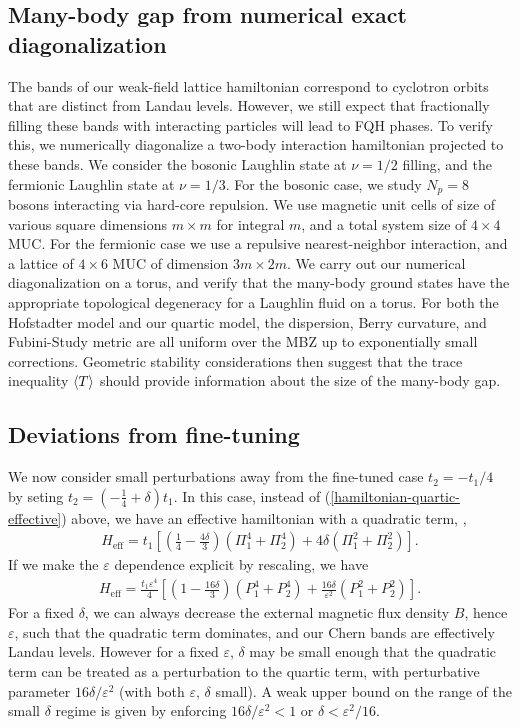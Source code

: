 \documentclass[aps,prb,twocolumn,letterpaper,twoside,nobalancelastpage,groupedaddress,amsmath,amssymb,floatfix,citeautoscript]{revtex4-1}
\begin{document}
\subsection{Many-body gap from numerical exact diagonalization}
The bands of our weak-field lattice hamiltonian correspond to cyclotron orbits that are distinct from Landau levels. However, we still expect that fractionally filling these bands with interacting particles will lead to FQH phases. To verify this, we numerically diagonalize a two-body interaction hamiltonian projected to these bands. We consider the bosonic Laughlin state at $\nu = 1/2$ filling, and the fermionic Laughlin state at $\nu = 1/3$. For the bosonic case, we study $N_p=8$ bosons interacting via hard-core repulsion. We use magnetic unit cells of size of various square dimensions $m \times m$ for integral $m$, and a total system size of $4\times4$ MUC. For the fermionic case we use a repulsive nearest-neighbor interaction, and a lattice of $4\times6$ MUC of dimension $3m\times2m$.  We carry out our numerical diagonalization on a torus, and verify that the many-body ground states have the appropriate topological degeneracy for a Laughlin fluid on a torus. For both the Hofstadter model and our quartic model, the dispersion, Berry curvature, and Fubini-Study metric are all uniform over the MBZ up to exponentially small corrections\cite{Harper:2014vi,bauer_quantum_2016}. Geometric stability considerations\cite{jackson_geometric_2015} then suggest that the trace inequality $\expval{T}$ should provide information about the size of the many-body gap.

\subsection{Deviations from fine-tuning}
We now consider small perturbations away from the fine-tuned case $t_2 = -t_1/4$ by seting $t_2 = \left(-\frac{1}{4} + \delta\right)t_1$. In this case, instead of (\ref{hamiltonian-quartic-effective}) above, we have an effective hamiltonian with a quadratic term, ,
\begin{align*}
\label{delta-hamiltonian}
H_{\text{eff}} = t_1 \left[\left(\frac{1}{4}-\frac{4\delta}{3}\right)\left(\Pi_1^4 + \Pi_2^4\right) + 4\delta \left(\Pi_1^2 + \Pi_2^2\right)\right].
\end{align*}
If we make the $\varepsilon$ dependence explicit by rescaling, we have
\begin{align}
H_{\text{eff}} = \frac{t_1\varepsilon^4}{4} \left[\left(1 - \frac{16\delta}{3}\right)\left(P_1^4 + P_2^4\right) + \frac{16\delta}{\varepsilon^2} \left(P_1^2 + P_2^2\right)\right].
\end{align}
For a fixed $\delta$, we can always decrease the external magnetic flux density $B$, hence $\varepsilon$, such that the quadratic term dominates, and our Chern bands are effectively Landau levels. However for a fixed $\varepsilon$, $\delta$ may be small enough that the quadratic term can be treated as a perturbation to the quartic term, with perturbative parameter $16 \delta/\varepsilon^2$ (with both $\varepsilon,\,\delta$ small). A weak upper bound on the range of the small $\delta$ regime is given by enforcing $16 \delta/\varepsilon^2 < 1$ or $\delta < \varepsilon^2/16$. 
\end{document}
